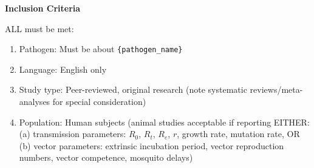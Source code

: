 
\begin{tcolorbox}[
    enhanced,
    colback=green!5,
    colframe=green!20,
    boxrule=0pt,
    leftrule=3pt,
    arc=0pt,
    left=6pt, right=6pt, top=4pt, bottom=4pt
]

{\small
{\textbf{\textcolor{green!60!black}{Inclusion Criteria}}}

{ALL must be met:}

\begin{enumerate}[leftmargin=*, itemsep=-3pt, topsep=2pt]
    \item {Pathogen:} Must be about \texttt{\{pathogen\_name\}}
    
    \item {Language:} English only
    
    \item {Study type:} Peer-reviewed, original research (note systematic reviews/meta-analyses for special consideration)
    
    \item {Population:} Human subjects (animal studies acceptable if reporting EITHER: (a) transmission parameters: $R_0$, $R_t$, $R_e$, $r$, growth rate, mutation rate, OR (b) vector parameters: extrinsic incubation period, vector reproduction numbers, vector competence, mosquito delays)
    

\end{enumerate}}
\end{tcolorbox}

